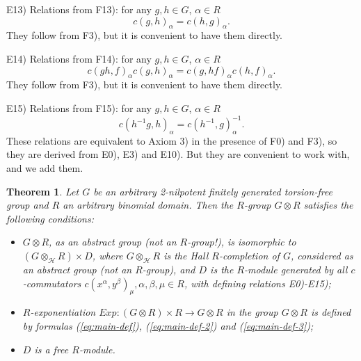 \documentclass[11pt]{article}
\newtheorem{theorem}{Theorem}[section]
\theoremstyle{definition}
\begin{document}
\medskip
\noindent
E13) Relations from F13): for any $g,h \in G$, $\alpha \in R$
$$
c(g,h)_\alpha = c(h,g)_\alpha.
$$
They follow from F3), but it is convenient to have them directly.

\medskip
\noindent
E14) Relations from F14): for any $g,h \in G$, $\alpha \in R$
$$
 c(gh,f)_\alpha c(g,h)_\alpha =c(g,hf)_\alpha c(h,f)_\alpha.
$$
They follow from F3), but it is convenient to have them directly.

\medskip
\noindent
E15) Relations from F15): for any $g,h \in G$, $\alpha \in R$
$$
   c(h^{-1}g,h)_\alpha =  c(h^{-1},g)_\alpha^{-1}.
   $$
These relations are equivalent to Axiom 3) in the presence of F0) and F3), so they are derived from E0), E3) and E10). But they are convenient to work with, and we add them.


\begin{theorem} \label{th:5.1}
Let $G$ be an arbitrary 2-nilpotent finitely generated torsion-free group and $R$ an arbitrary binomial domain. Then the $R$-group $G\otimes R$ satisfies the following conditions:
\begin{itemize}
    \item [1)] $G \otimes R$, as an abstract group (not an $R$-group!), is isomorphic to $(G \otimes_{\mathcal{H}} R) \times D$, where $G \otimes_{\mathcal{H}} R$ is the Hall $R$-completion of $G$, considered as an abstract group (not an $R$-group), and $D$ is the $R$-module generated by all $c$-commutators $c(x^\alpha,y^\beta)_\mu, \alpha, \beta, \mu \in R$, with defining relations E0)-E15);
    \item [2)] $R$-exponentiation  $Exp: (G \otimes R) \times R \to G \otimes R$ in the group $G \otimes R$ is defined by formulas (\ref{eq:main-def}), (\ref{eq:main-def-2}) and (\ref{eq:main-def-3});
    \item [3)] $D$ is a free $R$-module.
\end{itemize} 
\end{theorem}
\end{document}
